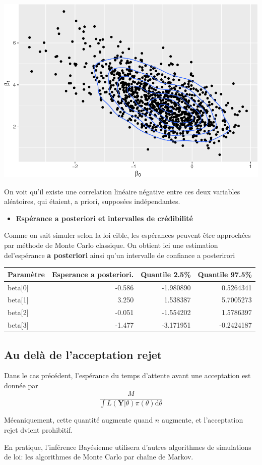 \documentclass[]{article}
\providecommand{\tightlist}{%
  \setlength{\itemsep}{0pt}\setlength{\parskip}{0pt}}
\begin{document}
\includegraphics{chapitre_inference_bayesienne_files/figure-latex/loi_jointe_beta0_beta1-1.pdf}

On voit qu'il existe une correlation linéaire négative entre ces deux
variables aléatoires, qui étaient, a priori, supposées indépendantes.

\begin{itemize}
\tightlist
\item
  \textbf{Espérance a posteriori et intervalles de crédibilité}
\end{itemize}

Comme on sait simuler selon la loi cible, les espérances peuvent être
approchées par méthode de Monte Carlo classique. On obtient ici une
estimation del'espérance \textbf{a posteriori} ainsi qu'un intervalle de
confiance a posterirori

\begin{longtable}[]{@{}lrrr@{}}
\toprule
Paramètre & Esperance a posteriori. & Quantile 2.5\% & Quantile
97.5\%\tabularnewline
\midrule
\endhead
beta{[}0{]} & -0.586 & -1.980890 & 0.5264341\tabularnewline
beta{[}1{]} & 3.250 & 1.538387 & 5.7005273\tabularnewline
beta{[}2{]} & -0.051 & -1.554202 & 1.5786397\tabularnewline
beta{[}3{]} & -1.477 & -3.171951 & -0.2424187\tabularnewline
\bottomrule
\end{longtable}

\hypertarget{au-deluxe0-de-lacceptation-rejet}{%
\subsection{Au delà de l'acceptation
rejet}\label{au-deluxe0-de-lacceptation-rejet}}

Dans le cas précédent, l'espérance du temps d'attente avant une
acceptation est donnée par
\[\frac{M}{\int L(\mathbf{Y}\vert \theta)\pi(\theta) \text{d}\theta}\]

Mécaniquement, cette quantité augmente quand \(n\) augmente, et
l'acceptation rejet dvient prohibitif.

En pratique, l'inférence Bayésienne utilisera d'autres algorithmes de
simulations de loi: les algorithmes de Monte Carlo par chaîne de Markov.
\end{document}
